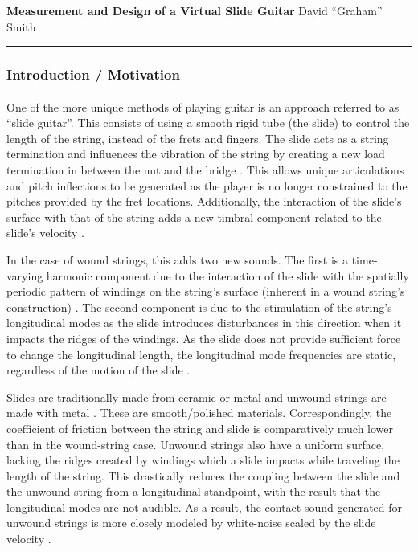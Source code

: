 \documentclass[12pt]{article}
\begin{document}
\begin{flushleft}
    \large \textbf{Measurement and Design of a Virtual Slide Guitar }
    \hfill
    \normalsize David ``Graham'' Smith
\end{flushleft}
\hrule

\subsubsection*{Introduction / Motivation}
\paragraph{}
One of the more unique methods of playing guitar is an approach referred to as “slide guitar”. This consists of using a smooth rigid tube (the slide) to control the length of the string, instead of the frets and fingers. The slide acts as a string termination and influences the vibration of the string by creating a new load termination in between the nut and the bridge \cite{evangelista_physical_2012}. This allows unique articulations and pitch inflections to be generated as the player is no longer constrained to the pitches provided by the fret locations. Additionally, the interaction of the slide’s surface with that of the string adds a new timbral component related to the slide’s velocity \cite{pakarinen_virtual_2008}. 

In the case of wound strings, this adds two new sounds. The first is a time-varying harmonic component due to the interaction of the slide with the spatially periodic pattern of windings on the string’s surface (inherent in a wound string’s construction) \cite{pakarinen_analysis_2007}. The second component is due to the stimulation of the string’s longitudinal modes as the slide introduces disturbances in this direction when it impacts the ridges of the windings. As the slide does not provide sufficient force to change the longitudinal length, the longitudinal mode frequencies are static, regardless of the motion of the slide \cite{pakarinen_analysis_2007}. 

Slides are traditionally made from ceramic or metal and unwound strings are made with metal \cite{bhanuprakash_finite_2020}. These are smooth/polished materials. Correspondingly, the coefficient of friction between the string and slide is comparatively much lower than in the wound-string case. Unwound strings also have a uniform surface, lacking the ridges created by windings which a slide impacts while traveling the length of the string. This drastically reduces the coupling between the slide and the unwound string from a longitudinal standpoint, with the result that the longitudinal modes are not audible. As a result, the contact sound generated for unwound strings is more closely modeled by white-noise scaled by the slide velocity \cite{pakarinen_virtual_2008}. 
\end{document}
